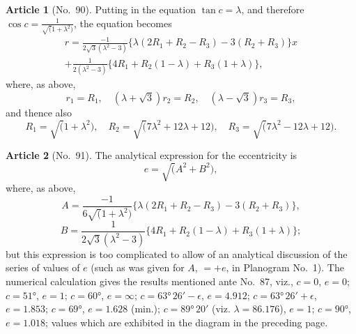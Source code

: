 \documentclass[11pt,a4paper]{article}
\theoremstyle{definition}
\newtheorem{art}{Article}
\begin{document}
\begin{art}[No.~90]
Putting in the equation $\tan c = \lambda$, and therefore $\cos c = \frac{1}{\surd(1 + \lambda^2)}$, the equation becomes
\begin{multline*}
r = \frac{-1}{2\surd 3(\lambda^2 - 3)}\{\lambda(2R_1 + R_2 - R_3) - 3(R_2 + R_3)\}x\\
+ \frac{1}{2(\lambda^2 - 3)}\{4R_1 + R_2(1 - \lambda) + R_3(1 + \lambda)\},
\end{multline*}
where, as above,
\[
r_1 = R_1, \quad (\lambda + \surd 3)r_2 = R_2, \quad (\lambda - \surd 3)r_3 = R_3,
\]
and thence also
\[
R_1 = \surd(1 + \lambda^2), \quad R_2 = \surd(7\lambda^2 + 12\lambda + 12), \quad R_3 = \surd(7\lambda^2 - 12\lambda + 12).
\]
\end{art}

\begin{art}[No.~91]
The analytical expression for the eccentricity is
\[
e = \surd(A^2 + B^2),
\]
where, as above,
\[
A = \frac{-1}{6\surd(1 + \lambda^2)}\{\lambda(2R_1 + R_2 - R_3) - 3(R_2 + R_3)\},
\]
\[
B = \frac{1}{2\surd 3(\lambda^2 - 3)}\{4R_1 + R_2(1 - \lambda) + R_3(1 + \lambda)\};
\]
but this expression is too complicated to allow of an analytical discussion of the series of values of $e$ (such as was given for $A$, $= +e$, in Planogram No.~1). The numerical calculation gives the results mentioned ante No.~87, viz., $c = 0$, $e = 0$; $c = 51°$, $e = 1$; $c = 60°$, $e = \infty$; $c = 63°\, 26' - \epsilon$, $e = 4.912$; $c = 63°\, 26' + \epsilon$, $e = 1.853$; $c = 69°$, $e = 1.628$ (min.); $c = 89°\, 20'$ (viz. $\lambda = 86.176$), $e = 1$; $c = 90°$, $e = 1.018$; values which are exhibited in the diagram in the preceding page.
\end{art}
\end{document}

